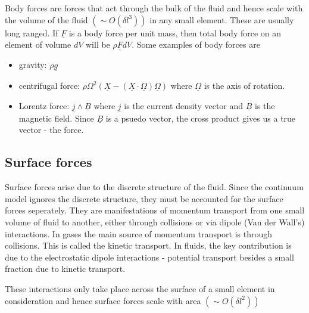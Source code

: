 \documentclass[11pt, letterpaper]{article}
\newcommand{\1}{\textbf{1}}
\newcommand{\vect}[1]{\underline{#1}} %
\begin{document}
Body forces are forces that act through the bulk of the fluid and hence scale with the volume of the fluid $(\sim O(\delta l^3))$ in any small element. These are usually long ranged. If $\vect{F}$ is a body force per unit mass, then total body force on an element of volume $dV$ will be $\rho \vect F dV$. Some examples of body forces are
\begin{itemize}
\item gravity: $\rho \vect g$
\item centrifugal force: $\rho \Omega^2(\vect X - (\vect X \cdot \vect\Omega)\vect\Omega)$ where $\vect\Omega$ is the axis of rotation.
\item Lorentz force: $\vect j \wedge \vect B$ where $\vect j$ is the current density vector and $\vect B$ is the magnetic field. Since $\vect B$ is a psuedo vector, the cross product gives us a true vector - the force. 
\end{itemize}

\subsection{Surface forces}
Surface forces arise due to the discrete structure of the fluid. Since the continuum model ignores the discrete structure, they must be accounted for the surface forces seperately. They are manifestations of momentum transport from one small volume of fluid to another, either through collisions or via dipole (Van der Wall's) interactions. In gases the main source of momentum transport is through collisions. This is called the kinetic transport. In fluids, the key contribution is due to the electrostatic dipole interactions - potential transport besides a small fraction due to kinetic transport.

These interactions only take place across the surface of a small element in consideration and hence surface forces scale with area $(\sim O(\delta l^2))$
\end{document}
